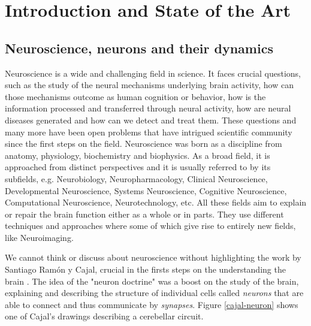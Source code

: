 \chapter{Introduction and State of the Art}
\label{c-intro}

\section{Neuroscience, neurons and their dynamics}
Neuroscience is a wide and challenging field in science. It faces crucial questions, such as the study of the neural mechanisms underlying brain activity, how can those mechanisms outcome as human cognition or behavior, how is the information processed and transferred through neural activity, how are neural diseases generated and how can we detect and treat them. 
These questions and many more have been open problems that have intrigued scientific community since the first steps on the field. Neuroscience was born as a discipline from anatomy, physiology, biochemistry and biophysics. As a broad field, it is approached from distinct perspectives and it is usually referred to by its subfields, e.g. Neurobiology, Neuropharmacology, Clinical Neuroscience, Developmental Neuroscience, Systems Neuroscience, Cognitive Neuroscience, Computational Neuroscience, Neurotechnology, etc. All these fields aim to explain or repair the brain function either as a whole or in parts. They use different techniques and approaches where some of which give rise to entirely new fields, like Neuroimaging.

We cannot think or discuss about neuroscience without highlighting the work by Santiago Ramón y Cajal, crucial in the firsts steps on the understanding the brain  \parencite{ramon_y_cajal_textura_1899,de_carlos_historical_2007,de_castro_editorial_2016,delgado-garcia_cajal_2015,de_castro_cajal_2019}. The idea of the "neuron doctrine" was a boost on the study of the brain, explaining and describing the structure of individual cells called \textit{neurons} that are able to connect and thus communicate by \textit{synapses}. Figure \ref{cajal-neuron} shows one of Cajal's drawings describing a cerebellar circuit.

